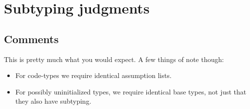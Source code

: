 \section{Subtyping judgments}



\begin{mathpar}
\end{mathpar}


\subsection{Comments}
This is pretty much what you would expect. A few things of note though:

\begin{itemize}
\item For code-types we require identical assumption lists.
\item For possibly uninitialized types, we require identical base types, not
  just that they also have subtyping.
\end{itemize}

